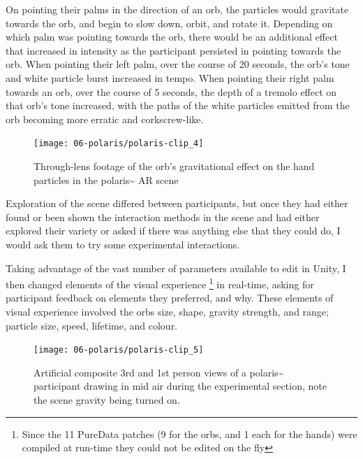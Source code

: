 On pointing their palms in the direction of an orb, the particles would gravitate towards the orb, and begin to slow down, orbit, and rotate it. Depending on which palm was pointing towards the orb, there would be an additional effect that increased in intensity as the participant persisted in pointing towards the orb. When pointing their left palm, over the course of 20 seconds, the orb's tone and white particle burst increased in tempo. When pointing their right palm towards an orb, over the course of 5 seconds, the depth of a tremolo effect on that orb's tone increased, with the paths of the white particles emitted from the orb becoming more erratic and corkscrew-like.

\begin{figure}[ht]
    \centering
    \texttt{[image: 06-polaris/polaris-clip\_4]}
    \captionsetup{justification=centering,margin=1.5cm}
    \caption{Through-lens footage of the orb’s gravitational effect on the hand particles in the polaris\textasciitilde{} AR scene \citep[from][\href{https://youtu.be/lCBgMs8ULj0?t=495}{at 8:14}]{bilbow2022c}}\label{fig: polaris-clip_4}
\end{figure}

Exploration of the scene differed between participants, but once they had either found or been shown the interaction methods in the scene and had either explored their variety or asked if there was anything else that they could do, I would ask them to try some experimental interactions.

Taking advantage of the vast number of parameters available to edit in Unity, I then changed elements of the visual   experience \footnote{Since the 11 PureData patches (9 for the orbs, and 1 each for the hands) were compiled at run-time they could not be edited on the fly} in real-time, asking for participant feedback on elements they preferred, and why. These elements of visual experience involved the orbs size, shape, gravity strength, and range; particle size, speed, lifetime, and colour.

\begin{figure}[ht]
    \centering
    \texttt{[image: 06-polaris/polaris-clip\_5]}
    \captionsetup{justification=centering,margin=1.5cm}
    \caption{Artificial composite 3rd and 1st person views of a polaris\textasciitilde{} participant drawing in mid air during the experimental section, note the scene gravity being turned on.  \citep[from][\href{https://youtu.be/72JLG1fGboY}{at 0:00}]{bilbow2022}}\label{fig: polaris-clip_5}
\end{figure}

